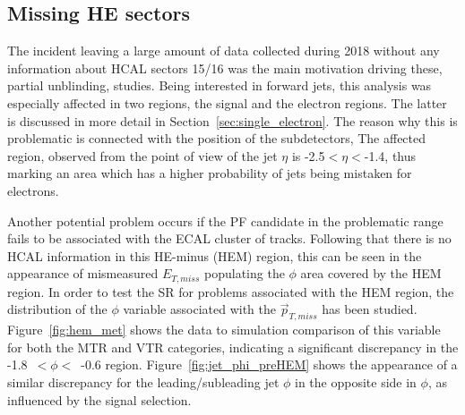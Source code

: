 \subsection{Missing HE sectors}
\hspace{10pt} The incident leaving a large amount of data collected during 2018 without any information about HCAL sectors 15/16 was the main motivation driving these, partial unblinding, studies. Being interested in forward jets, this analysis was especially affected in two regions, the signal and the electron regions. The latter is discussed in more detail in Section~\ref{sec:single_electron}. The reason why this is problematic is connected with the position of the subdetectors, The affected region, observed from the point of view of the jet $\eta$ is -2.5$<\eta<$-1.4, thus marking an area which has a higher probability of jets being mistaken for electrons.

\hspace{10pt} Another potential problem occurs if the PF candidate in the problematic range fails to be associated with the ECAL cluster of tracks. Following that there is no HCAL information in this HE-minus (HEM) region, this can be seen in the appearance of mismeasured $E_{T,miss}$ populating the $\phi$ area covered by the HEM region. In order to test the SR for problems associated with the HEM region, the distribution of the $\phi$ variable associated with the $\vec{p}_{T, miss}$ has been studied. Figure~\ref{fig:hem_met} shows the data to simulation comparison of this variable for both the MTR and VTR categories, indicating a significant discrepancy in the -1.8~$<\phi<$~-0.6 region. Figure~\ref{fig:jet_phi_preHEM} shows the appearance of a similar discrepancy for the leading/subleading jet $\phi$ in the opposite side in $\phi$, as influenced by the signal selection. 


